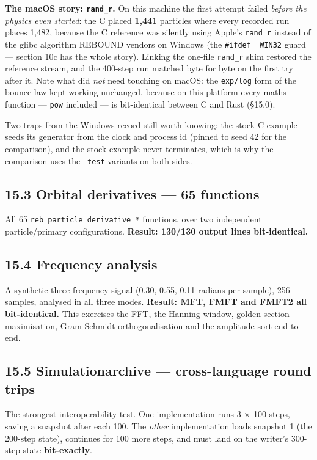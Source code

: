 \documentclass[11pt]{article}
\begin{document}
\textbf{The macOS story: \texttt{rand\_r}.} On this machine the first attempt failed \emph{before the physics even started}: the C placed \textbf{1,441} particles where every recorded run places 1,482, because the C reference was silently using Apple's \texttt{rand\_r} instead of the glibc algorithm REBOUND vendors on Windows (the \texttt{\#ifdef \_WIN32} guard --- section 10c has the whole story). Linking the one-file \texttt{rand\_r} shim restored the reference stream, and the 400-step run matched byte for byte on the first try after it. Note what did \emph{not} need touching on macOS: the \texttt{exp/log} form of the bounce law kept working unchanged, because on this platform every maths function --- \texttt{pow} included --- is bit-identical between C and Rust (\S{}15.0).

Two traps from the Windows record still worth knowing: the stock C example seeds its generator from the clock and process id (pinned to seed 42 for the comparison), and the stock example never terminates, which is why the comparison uses the \texttt{\_test} variants on both sides.

\subsection{15.3 Orbital derivatives --- 65 functions}

All 65 \texttt{reb\_particle\_derivative\_*} functions, over two independent particle/primary configurations. \textbf{Result: 130/130 output lines bit-identical.}

\subsection{15.4 Frequency analysis}

A synthetic three-frequency signal (0.30, 0.55, 0.11 radians per sample), 256 samples, analysed in all three modes. \textbf{Result: MFT, FMFT and FMFT2 all bit-identical.} This exercises the FFT, the Hanning window, golden-section maximisation, Gram-Schmidt orthogonalisation and the amplitude sort end to end.

\subsection{15.5 Simulationarchive --- cross-language round trips}

The strongest interoperability test. One implementation runs 3 \(\times\) 100 steps, saving a snapshot after each 100. The \emph{other} implementation loads snapshot 1 (the 200-step state), continues for 100 more steps, and must land on the writer's 300-step state \textbf{bit-exactly}.
\end{document}
